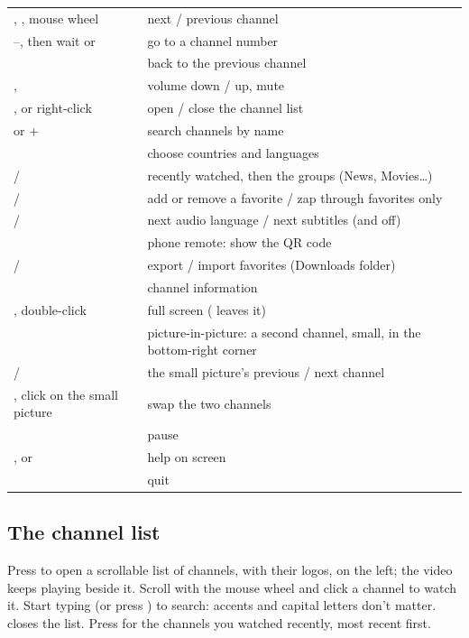 \begin{xltabular}{\linewidth}{@{}KX@{}}
\key{$\uparrow$} \key{$\downarrow$},  , mouse wheel & next / previous channel \\
--, then wait or  & go to a channel number \\
 & back to the previous channel \\
\key{$\leftarrow$} \key{$\rightarrow$},  & volume down / up, mute \\
,  or right-click & open / close the channel list \\
\key{/} or + & search channels by name \\
 & choose countries and languages \\
 /  & recently watched, then the groups (News, Movies\ldots) \\
 /  & add or remove a favorite / zap through favorites only \\
 /  & next audio language / next subtitles (and off) \\
 & phone remote: show the QR code \\
 /  & export / import favorites (Downloads folder) \\
 & channel information \\
, double-click & full screen ( leaves it) \\
 & picture-in-picture: a second channel, small, in the bottom-right corner \\
\key{[} / \key{]} & the small picture's previous / next channel \\
, click on the small picture & swap the two channels \\
 & pause \\
,  or  & help on screen \\
 & quit \\
\bottomrule
\end{xltabular}

\subsection{The channel list}
Press  to open a scrollable list of channels, with their logos, on the
left; the video keeps playing beside it. Scroll with the mouse wheel and click
a channel to watch it. Start typing (or press \key{/}) to search: accents and
capital letters don't matter.  closes the list. Press  for the
channels you watched recently, most recent first.

